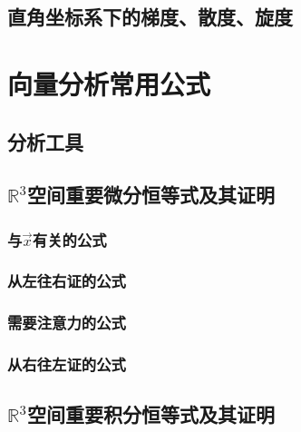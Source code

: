 \subsection{直角坐标系下的梯度、散度、旋度}




\section{向量分析常用公式}

\subsection{分析工具}

\subsection{\texorpdfstring{$\mathbb{R}^3 $空间重要微分恒等式及其证明}{R3空间重要微分恒等式及其证明}}

\subsubsection{\texorpdfstring{与$\vec{x}$有关的公式}{与x有关的公式}}

\subsubsection{从左往右证的公式}

\subsubsection{需要注意力的公式}

\subsubsection{从右往左证的公式}

\subsection{\texorpdfstring{$\mathbb{R}^3 $空间重要积分恒等式及其证明}{R3空间重要积分恒等式及其证明}}



